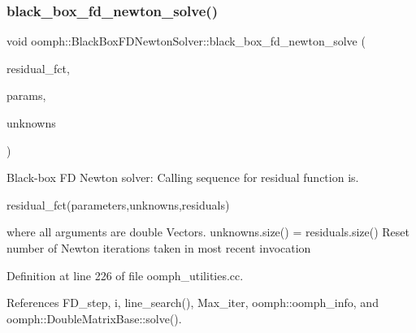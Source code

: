 \subsubsection{\texorpdfstring{black\+\_\+box\+\_\+fd\+\_\+newton\+\_\+solve()}{black\_box\_fd\_newton\_solve()}}
{\footnotesize\ttfamily void oomph\+::\+Black\+Box\+F\+D\+Newton\+Solver\+::black\+\_\+box\+\_\+fd\+\_\+newton\+\_\+solve (\begin{DoxyParamCaption}\item[{\hyperlink{namespaceoomph_1_1BlackBoxFDNewtonSolver_a0b45d0bd1b7ae8ff5c24715b6118d1fd}{Residual\+Fct\+Pt}}]{residual\+\_\+fct,  }\item[{const \hyperlink{classoomph_1_1Vector}{Vector}$<$ double $>$ \&}]{params,  }\item[{\hyperlink{classoomph_1_1Vector}{Vector}$<$ double $>$ \&}]{unknowns }\end{DoxyParamCaption})}



Black-\/box FD Newton solver\+: Calling sequence for residual function is. 


\begin{DoxyCode}
residual\_fct(parameters,unknowns,residuals) 
\end{DoxyCode}
 where all arguments are double Vectors. unknowns.\+size() = residuals.\+size() Reset number of Newton iterations taken in most recent invocation 

Definition at line 226 of file oomph\+\_\+utilities.\+cc.



References F\+D\+\_\+step, i, line\+\_\+search(), Max\+\_\+iter, oomph\+::oomph\+\_\+info, and oomph\+::\+Double\+Matrix\+Base\+::solve().

\mbox{\label{namespaceoomph_1_1BlackBoxFDNewtonSolver_a4a1361a9b08163b59fe82b3042b0f887}} 
